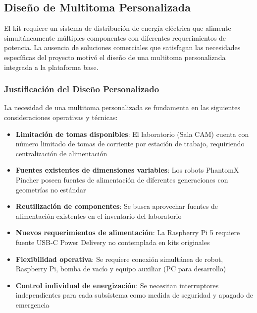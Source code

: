 \subsection{Diseño de Multitoma Personalizada}

El kit requiere un sistema de distribución de energía eléctrica que alimente simultáneamente múltiples componentes con diferentes requerimientos de potencia. La ausencia de soluciones comerciales que satisfagan las necesidades específicas del proyecto motivó el diseño de una multitoma personalizada integrada a la plataforma base.

\subsubsection{Justificación del Diseño Personalizado}

La necesidad de una multitoma personalizada se fundamenta en las siguientes consideraciones operativas y técnicas:

\begin{itemize}
    \item \textbf{Limitación de tomas disponibles}: El laboratorio (Sala CAM) cuenta con número limitado de tomas de corriente por estación de trabajo, requiriendo centralización de alimentación
    
    \item \textbf{Fuentes existentes de dimensiones variables}: Los robots PhantomX Pincher poseen fuentes de alimentación de diferentes generaciones con geometrías no estándar
    
    \item \textbf{Reutilización de componentes}: Se busca aprovechar fuentes de alimentación existentes en el inventario del laboratorio
    
    \item \textbf{Nuevos requerimientos de alimentación}: La Raspberry Pi 5 requiere fuente USB-C Power Delivery no contemplada en kits originales
    
    \item \textbf{Flexibilidad operativa}: Se requiere conexión simultánea de robot, Raspberry Pi, bomba de vacío y equipo auxiliar (PC para desarrollo)
    
    \item \textbf{Control individual de energización}: Se necesitan interruptores independientes para cada subsistema como medida de seguridad y apagado de emergencia
\end{itemize}

